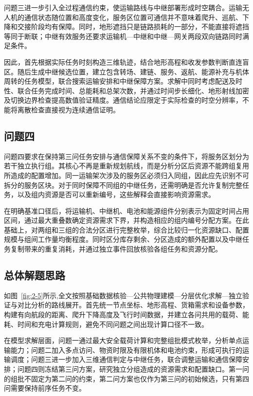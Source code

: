\documentclass[bwprint]{gmcmthesis}
\begin{document}
问题三进一步引入全过程通信约束，使运输路线与中继部署形成时空耦合。运输无人机的通信状态随位置和高度变化，服务区位置可通信并不意味着爬升、巡航、下降和交接阶段均有保障。同时，地形遮挡只是链路损耗的一部分，不能直接将遮挡等同于断联；中继有效服务还要求运输机—中继和中继—网关两段双向链路同时满足条件。

因此，首先根据实际任务时刻构造三维轨迹，结合地形高程和收发参数判断直连盲区。随后生成中继候选位置，建立包含转场、建链、服务、返航、能源补充与机体周转的任务模型，联合搜索运输安排和中继保障方案。求解中同时考虑配送及时性、联合任务完成时间、总能耗和总架次数，并通过时间步长细化、地形射线加密及切换边界检查提高数值验证精度。通信结论应限定于实际检查的时空分辨率，不能将离散检查直接视为连续通信证明。

\subsection{问题四}

问题四要求在保持第三问任务安排与通信保障关系不变的条件下，将服务区划分为若干独立执行组。其核心不再是重新规划航线，而是分析分区后资源不能跨组复用所造成的配置增加。同一运输架次涉及的服务区必须归入同组，因此应先识别不可拆分的服务区块。对于同时保障不同组的中继任务，还需明确是否允许复制完整任务，以及组内资源是否可以重新编号，这些解释会直接影响资源需求。

在明确基准口径后，将运输机、中继机、电池和能源组件分别表示为固定时间占用区间，通过最大重叠数确定资源需求下界，并构造相应的组内编号分配方案。在此基础上，对两组和三组的合法分区进行完整枚举，综合比较归一化资源缺口、配置规模与组间工作量均衡程度。同时区分库存剩余、分区造成的额外配置以及中继任务复制带来的重复消耗，并通过独立事件回放核验各组任务和资源分配。

\subsection{总体解题思路}

如图~\ref{fig:2-5}所示,全文按照基础数据核验—公共物理建模—分层优化求解—独立验证与对比分析的路线展开。首先统一节点坐标、地形高程、货箱需求和设备参数，构建有向航段的距离、爬升下降高度及飞行时间数据，并建立各问共用的载荷、能耗、时间和充电计算规则，避免不同问题之间出现计算口径不一致。

在模型求解层面，问题一通过最大安全载荷计算和完整组批模式枚举，分析单点运输能力；问题二加入多点访问、物资时限及有限机体和电池约束，形成可执行的运输调度；问题三进一步加入三维通信判定与中继任务，联合调整运输和通信保障安排；问题四则冻结第三问方案，研究独立分组造成的资源需求和配置缺口。第一问的组批不固定为第二问的约束，第二问方案也仅作为第三问的初始候选，只有第四问需要保持前序任务不变。
\end{document}
